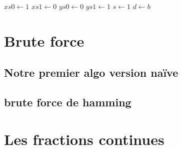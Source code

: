 \documentclass[a4paper, 11pt]{article}
\begin{document}
\begin{algorithm}
    $xs0 \leftarrow 1 $ \;
    $xs1 \leftarrow 0 $ \;
    $ys0 \leftarrow 0 $ \;
    $ys1 \leftarrow 1 $ \;
    $s \leftarrow 1 $ \;
    $d \leftarrow b $ \;
\end{algorithm}



\newpage
\section{Brute force}
\subsection{Notre premier algo version naïve }



\subsection{brute force de hamming}


\newpage
\section{Les fractions continues}
\end{document}
